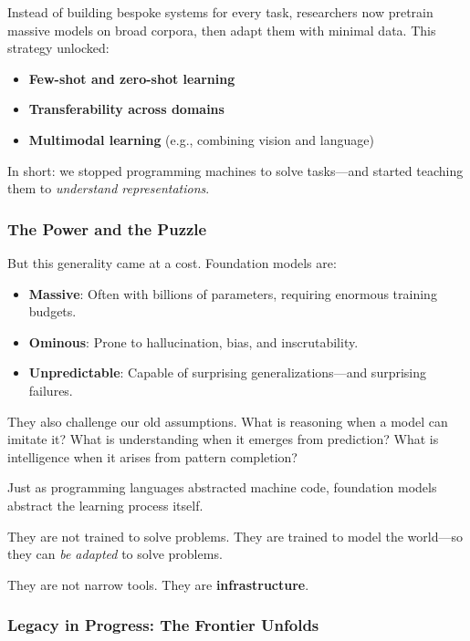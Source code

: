 Instead of building bespoke systems for every task, researchers now pretrain massive models on broad corpora, then adapt them with minimal data. This strategy unlocked:

\begin{itemize}
  \item \textbf{Few-shot and zero-shot learning}
  \item \textbf{Transferability across domains}
  \item \textbf{Multimodal learning} (e.g., combining vision and language)
\end{itemize}

In short: we stopped programming machines to solve tasks—and started teaching them to \emph{understand representations}.

\subsubsection{The Power and the Puzzle}

But this generality came at a cost. Foundation models are:

\begin{itemize}
  \item \textbf{Massive}: Often with billions of parameters, requiring enormous training budgets.
  \item \textbf{Ominous}: Prone to hallucination, bias, and inscrutability.
  \item \textbf{Unpredictable}: Capable of surprising generalizations—and surprising failures.
\end{itemize}

They also challenge our old assumptions. What is reasoning when a model can imitate it? What is understanding when it emerges from prediction? What is intelligence when it arises from pattern completion?

\begin{tcolorbox}[colback=gray!5!white, colframe=black!75!white, title={Foundation Models: A New Layer of Abstraction}]
Just as programming languages abstracted machine code,  
foundation models abstract the learning process itself.

They are not trained to solve problems.  
They are trained to model the world—so they can \emph{be adapted} to solve problems.

They are not narrow tools.  
They are \textbf{infrastructure}.
\end{tcolorbox}

\subsubsection{Legacy in Progress: The Frontier Unfolds}

